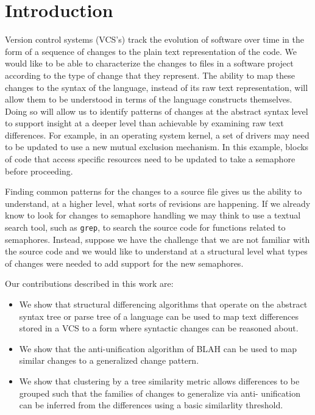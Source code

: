 \section{Introduction}

Version control systems (VCS's) track the evolution of software over time in the form
of a sequence of changes to the plain text representation of the code.
We would like to be able to characterize the changes to files in a software
project according to the type of change that they represent.  The ability to
map these changes to the syntax of the language, instead of its raw text
representation, will allow them to be understood in terms of the language
constructs themselves.  Doing so will allow us to identify patterns of
changes at the abstract syntax level to support insight at a deeper level
than achievable by examining raw text differences.  For example, in
an operating system kernel, a set of drivers may need to be updated to use a
new mutual exclusion mechanism. In this example, blocks of code that access
specific resources need to be updated to take a semaphore before proceeding.

Finding common patterns for the changes to a source file gives us the ability
to understand, at a higher level, what sorts of revisions are happening. If we
already know to look for changes to semaphore handling we may think to use a
textual search tool, such as {\tt grep}, to search the source code for
functions related to semaphores. Instead, suppose we have the challenge that we
are not familiar with the source code and we would like to understand at a
structural level what types of changes were needed to add support for the new
semaphores.

Our contributions described in this work are:

\begin{itemize}

\item We show that structural differencing algorithms that operate on the
abstract syntax tree or parse tree of a language can be used to map text
differences stored in a VCS to a form where syntactic changes can be reasoned
about.

\item We show that the anti-unification algorithm of BLAH can be used to map
similar changes to a generalized change pattern.

\item We show that clustering by a tree similarity metric allows differences
to be grouped such that the families of changes to generalize via anti-
unification can be inferred from the differences using a basic similarlity
threshold.

\end{itemize}

